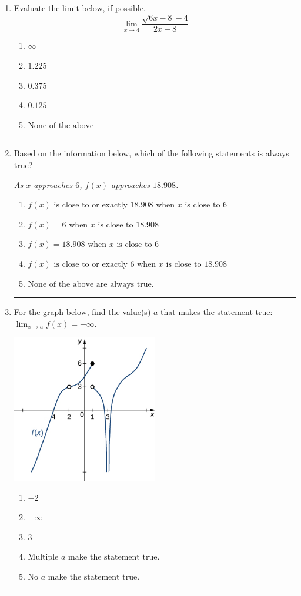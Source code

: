 \documentclass[14pt]{extbook}
\newcommand{\litem}[1]{\item#1\hspace*{-1cm}\rule{\textwidth}{0.4pt}}
\begin{document}
\begin{enumerate}
\litem{
Evaluate the limit below, if possible.\[ \lim_{x \rightarrow 4} \frac{\sqrt{6x - 8} - 4}{2x - 8} \]\begin{enumerate}[label=\Alph*.]
\item \( \infty \)
\item \( 1.225 \)
\item \( 0.375 \)
\item \( 0.125 \)
\item \( \text{None of the above} \)

\end{enumerate} }
\litem{
Based on the information below, which of the following statements is always true?
\begin{center}
    \textit{ As $x$ approaches $6$, $f(x)$ approaches $18.908$. }
\end{center}
\begin{enumerate}[label=\Alph*.]
\item \( f(x) \text{ is close to or exactly } 18.908 \text{ when } x \text{ is close to } 6 \)
\item \( f(x) = 6 \text{ when } x \text{ is close to } 18.908 \)
\item \( f(x) = 18.908 \text{ when } x \text{ is close to } 6 \)
\item \( f(x) \text{ is close to or exactly } 6 \text{ when } x \text{ is close to } 18.908 \)
\item \( \text{None of the above are always true.} \)

\end{enumerate} }
\litem{
For the graph below, find the value(s) $a$ that makes the statement true: $ \displaystyle \lim_{x \rightarrow a} f(x) = -\infty$.
\begin{center}
    \includegraphics[width=0.5\textwidth]{../Figures/evaluateLimitGraphicallyCopyA.png}
\end{center}
\begin{enumerate}[label=\Alph*.]
\item \( -2 \)
\item \( -\infty \)
\item \( 3 \)
\item \( \text{Multiple } a \text{ make the statement true}. \)
\item \( \text{No } a \text{ make the statement true}. \)


\end{enumerate}}
\end{enumerate}
\end{document}
